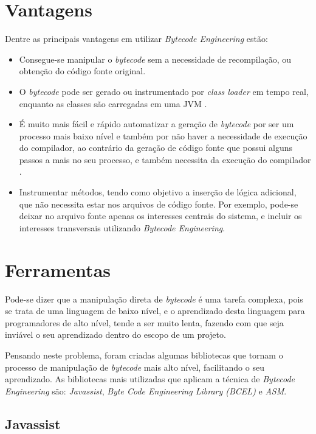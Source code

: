 \documentclass[tc,oneside]{iiufrgs}
\begin{document}
\section {Vantagens}

Dentre as principais vantagens em utilizar \textit{Bytecode Engineering} estão:

\begin{itemize}
\item Consegue-se manipular o \textit{bytecode} sem a necessidade de recompilação, ou obtenção do código fonte original.
\item O \textit{bytecode} pode ser gerado ou instrumentado por \textit{class loader} em tempo real, enquanto as classes são carregadas em uma JVM \cite{kalinovsky2004covert}.
\item É muito mais fácil e rápido automatizar a geração de \textit{bytecode} por ser um processo mais baixo nível e também por não haver a necessidade de execução do compilador, ao contrário da geração de código fonte que possui alguns passos a mais no seu processo, e também necessita da execução do compilador \cite{kalinovsky2004covert}.
\item Instrumentar métodos, tendo como objetivo a inserção de lógica adicional, que não necessita estar nos arquivos de código fonte. Por exemplo, pode-se deixar no arquivo fonte apenas os interesses centrais do sistema, e incluir os interesses transversais utilizando \textit{Bytecode Engineering}. 
\end{itemize}

\section{Ferramentas}

Pode-se dizer que a manipulação direta de \textit{bytecode} é uma tarefa complexa, pois se trata de uma linguagem de baixo nível, e o aprendizado desta linguagem para programadores de alto nível, tende a ser muito lenta, fazendo com que seja inviável o seu aprendizado dentro do escopo de um projeto.

Pensando neste problema, foram criadas algumas bibliotecas que tornam o processo de manipulação de \textit{bytecode} mais alto nível, facilitando o seu aprendizado. As bibliotecas mais utilizadas que aplicam a técnica de \textit{Bytecode Engineering} são: \textit{Javassist}, \textit{Byte Code Engineering Library (BCEL)} e \textit{ASM}.

\subsection {Javassist}
\end{document}
